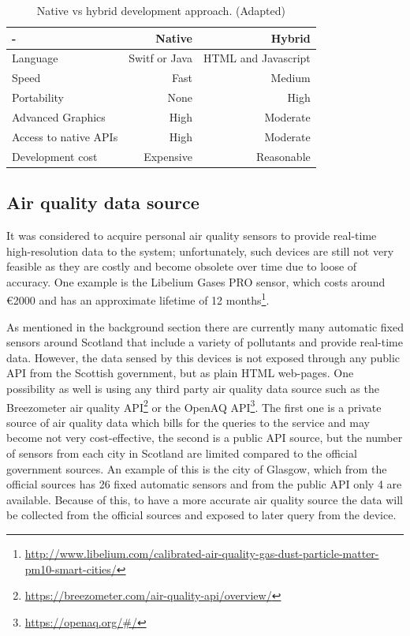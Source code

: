 \begin{table}[ht]
\centering
\begin{adjustbox}{width=.6\textwidth,center=\textwidth}
\begin{tabular}{lrr}
  \hline
   - & Native & Hybrid  \\ \hline
   Language & Switf or Java & HTML and Javascript \\
   Speed & Fast & Medium \\
   Portability & None & High \\
   Advanced Graphics & High & Moderate \\
   Access to native APIs & High & Moderate \\
   Development cost & Expensive & Reasonable \\
   \hline
\end{tabular}
\end{adjustbox}
  \caption[Native vs hybrid development approach ]{Native vs hybrid development approach. (Adapted) \footnotemark }
\label{tab:development_approaches}
\end{table} 

\subsection{Air quality data source}
It was considered to acquire personal air quality sensors to provide real-time high-resolution data to the system; unfortunately, such devices are still not very feasible as they are costly and become obsolete over time due to loose of accuracy. One example is the Libelium Gases PRO sensor, which costs around \euro{}2000 and has an approximate lifetime of 12 months\footnote{\url{http://www.libelium.com/calibrated-air-quality-gas-dust-particle-matter-pm10-smart-cities/}}. 

As mentioned in the background section there are currently many automatic fixed sensors around Scotland that include a variety of pollutants and provide real-time data. However, the data sensed by this devices is not exposed through any public API from the Scottish government, but as plain HTML web-pages. One possibility as well is using any third party air quality data source such as the Breezometer air quality API\footnote{\url{https://breezometer.com/air-quality-api/overview/}} or the OpenAQ API\footnote{\url{https://openaq.org/#/}}. The first one is a private source of air quality data which bills for the queries to the service and may become not very cost-effective, the second is a public API source, but the number of sensors from each city in Scotland are limited compared to the official government sources. An example of this is the city of Glasgow, which from the official sources has 26 fixed automatic sensors and from the public API only 4 are available. Because of this, to have a more accurate air quality source the data will be collected from the official sources and exposed to later query from the device. 


